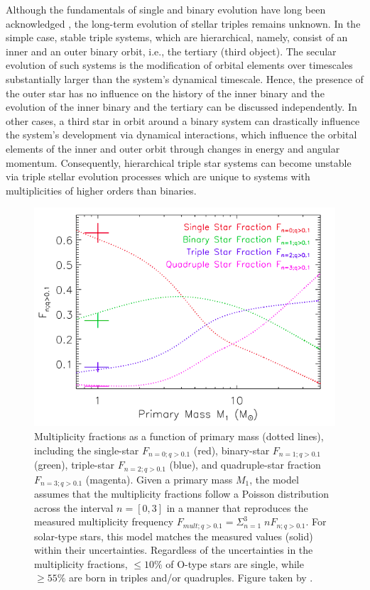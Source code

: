 Although the fundamentals of single and binary evolution have long been acknowledged \citep{postnov2014evolution,toonen2014popcorn}, the long-term evolution of stellar triples remains unknown. In the simple case, stable triple systems, which are hierarchical, namely, consist of an inner and an outer binary orbit, i.e., the tertiary (third object). The secular evolution of such systems is the modification of orbital elements over timescales substantially larger than the system's dynamical timescale. Hence, the presence of the outer star has no influence on the history of the inner binary and the evolution of the inner binary and the tertiary can be discussed independently. In other cases, a third star in orbit around a binary system can drastically influence the system's development
via dynamical interactions, which influence the orbital elements of the inner and outer orbit through changes in energy and angular momentum. Consequently, hierarchical triple star systems can become unstable via triple stellar evolution processes which are unique to systems with multiplicities of higher orders than binaries.
\begin{figure}[H]
    \centering
    \includegraphics[width=\textwidth]{Thesis/figures/fig_moe_2017.png}
    \caption{Multiplicity fractions as a function of primary mass (dotted lines), including the single-star $F_{n=0;q> 0.1}$ (red), binary-star $F_{n=1;q> 0.1}$  (green), triple-star $F_{n=2;q> 0.1}$  (blue), and quadruple-star fraction $F_{n=3;q> 0.1}$  (magenta). Given a primary mass $M_1$, the model assumes that the multiplicity fractions follow a Poisson distribution across the interval $n = [0, 3]$ in a manner that reproduces the measured multiplicity frequency $F_{mult;q >0.1} = \Sigma_{n=1}^3 \; n F_{n;q> 0.1}$. For solar-type stars, this model matches the measured values (solid) within their uncertainties. Regardless of the uncertainties in the multiplicity fractions, $\leq 10\%$ of O-type stars are single, while $\geq 55\%$ are born in triples and/or quadruples. Figure taken by \cite{moe2017mind}.}
    \label{fig:stellar_companions}
\end{figure}
